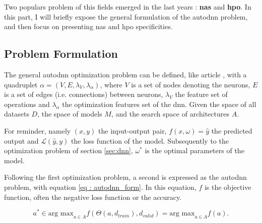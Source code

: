 Two populars problem of this fields emerged in the last years : \textbf{\acrfull{nas}} and \textbf{\acrfull{hpo}}. In this part, I will briefly expose the general formulation of the \acrshort{autodnn} problem, and then focus on presenting \acrshort{nas} and \acrshort{hpo} specificities. 


\subsection{Problem Formulation}
\label{sec : autodnn_pbm}
The general \acrshort{autodnn} optimization problem can be defined, like article \cite{talbi_automated_2021}, with a quadruplet $\alpha = (V,E,\lambda_V, \lambda_\alpha)$, where $V$ is a set of nodes denoting the neurons, $E$ is a set of edges (i.e. connections) between neurons, $\lambda_V$ the feature set of operations and $\lambda_\alpha$ the optimization features set of the \acrshort{dnn}. Given the space of all datasets $D$, the space of models $M$, and the search space of architectures $A$.

For reminder, namely $(x,y)$ the input-output pair, $f(x,\omega)=\hat{y}$ the predicted output and $\mathcal{L}(\hat{y},y)$ the loss function of the model. Subsequently to the optimization problem of section \ref{sec:dnn}, $\omega^*$ is the optimal parameters of the model.

Following the first optimization problem, a second is expressed as the \acrshort{autodnn} problem, with equation \ref{eq : autodnn_form}. In this equation, $f$ is the objective function, often the negative loss function or the accuracy. 

\begin{equation}
    a^* \in \text{arg max}_{a\in A}f(\Theta (a, d_{train}), d_{valid})= \text{arg max}_{a \in A} f(a).
    \label{eq : autodnn_form}
\end{equation}

